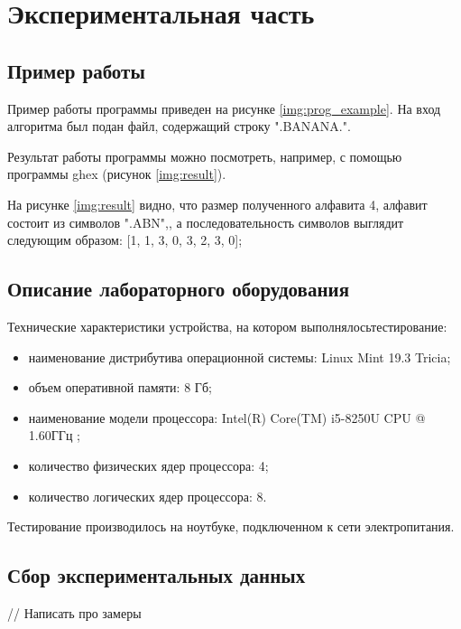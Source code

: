 \chapter{Экспериментальная часть}
\label{cha:research}

\section{Пример работы}

Пример работы программы приведен на рисунке \ref{img:prog_example}. На вход алгоритма был подан файл, содержащий строку ".BANANA.".


Результат работы программы можно посмотреть, например, с помощью программы ghex \cite{r4} (рисунок \ref{img:result}).


На рисунке \ref{img:result} видно, что размер полученного алфавита 4, алфавит состоит из символов ".ABN",, а последовательность символов выглядит следующим образом: [1, 1, 3, 0, 3, 2, 3, 0];

\section{Описание лабораторного оборудования}

Технические характеристики устройства, на котором выполнялосьтестирование:
\begin{itemize}
	\item наименование дистрибутива операционной системы: Linux Mint 19.3 Tricia;
	\item объем оперативной памяти: 8 Гб;
 	\item наименование модели процессора: Intel(R) Core(TM) i5-8250U CPU @ 1.60ГГц \cite{r5};
 	\item количество физических ядер процессора: 4;
 	\item количество логических ядер процессора: 8.
\end{itemize}

Тестирование производилось на ноутбуке, подключенном к сети электропитания.

\section{Сбор экспериментальных данных}

// Написать про замеры

